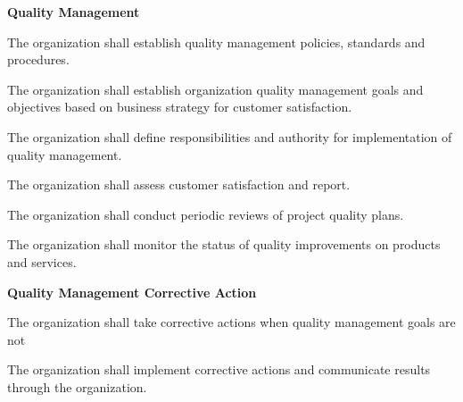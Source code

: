 			\begin{adjustwidth}{2em}{0pt} 

				\begin{compactenum}

					\item {\bf Quality Management}

					\begin{compactenum}
						
						\item The organization shall establish quality management policies, standards and procedures.

						\item The organization shall establish organization quality management goals and objectives based on business strategy for customer satisfaction.
						
						\item The organization shall define responsibilities and authority for implementation of quality management.

						\item The organization shall assess customer satisfaction and report.

						\item The organization shall conduct periodic reviews of project quality plans.

						\item The organization shall monitor the status of quality improvements on products and services.

					\end{compactenum}


					\item {\bf Quality Management Corrective Action}

					\begin{compactenum}

						\item The organization shall take corrective actions when quality management goals are not
						
						\item The organization shall implement corrective actions and communicate results through the organization.

					\end{compactenum}

				\end{compactenum}

			\end{adjustwidth}


